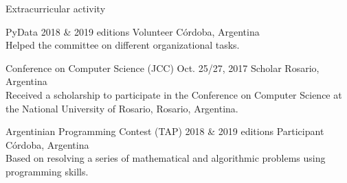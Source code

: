 \documentclass{curriculum}
\begin{document}

\begin{cvsection}{Extracurricular activity}

    \makesectionitemheader
        {PyData}                                            {2018 \& 2019 editions}
        {Volunteer}                                         {Córdoba, Argentina} \\
        \vspace{0.5ex}
        {Helped the committee on different organizational tasks.}

    \makesectionitemheader
        {Conference on Computer Science (JCC)}              {Oct. 25/27, 2017}
        {Scholar}                                           {Rosario, Argentina} \\
        \vspace{0.5ex}
        {
            Received a scholarship to participate in the Conference on
            Computer Science at the National University of Rosario, Rosario, Argentina.
        }

    \makesectionitemheader
        {Argentinian Programming Contest (TAP)}             {2018 \& 2019 editions}
        {Participant}                                       {Córdoba, Argentina} \\
        \vspace{0.5ex}
        {
            Based on resolving a series of mathematical and algorithmic
            problems using programming skills.
        }

\end{cvsection}

\end{document}

